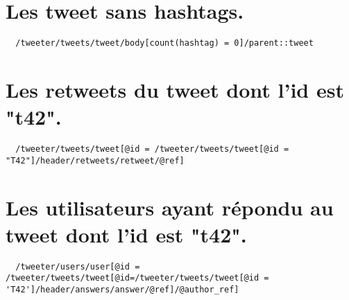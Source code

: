 \section{Les tweet sans hashtags.}
\begin{verbatim}
  /tweeter/tweets/tweet/body[count(hashtag) = 0]/parent::tweet
\end{verbatim}

\section{Les retweets du tweet dont l’id est "t42".}
\begin{verbatim}
  /tweeter/tweets/tweet[@id = /tweeter/tweets/tweet[@id = "T42"]/header/retweets/retweet/@ref]
\end{verbatim}

\section{Les utilisateurs ayant répondu au tweet dont l’id est "t42".}
\begin{verbatim}
  /tweeter/users/user[@id = /tweeter/tweets/tweet[@id=/tweeter/tweets/tweet[@id = 'T42']/header/answers/answer/@ref]/@author_ref]
\end{verbatim}

